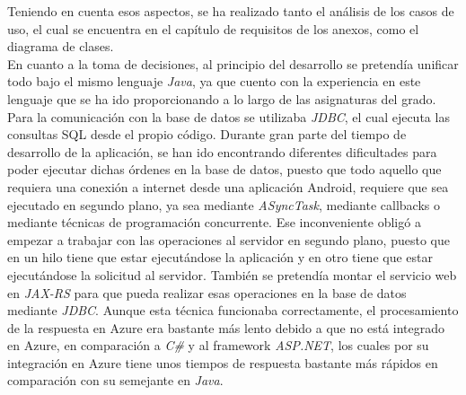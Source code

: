 Teniendo en cuenta esos aspectos, se ha realizado tanto el análisis de los casos
de uso, el cual se encuentra en el capítulo de requisitos de los anexos, como el
diagrama de clases.
\\
En cuanto a la toma de decisiones, al principio del desarrollo se pretendía
unificar todo bajo el mismo lenguaje \textit{Java}, ya que cuento con la
experiencia en este lenguaje que se ha ido proporcionando a lo largo de las
asignaturas del grado. Para la comunicación con la base de datos se utilizaba
\textit{JDBC}, el cual ejecuta las consultas SQL desde el propio código. Durante
gran parte del tiempo de desarrollo de la aplicación, se han ido encontrando
diferentes dificultades para poder ejecutar dichas órdenes en la base de datos,
puesto que todo aquello que requiera una conexión a internet desde una
aplicación Android, requiere que sea ejecutado en segundo plano, ya sea mediante
\textit{ASyncTask}, mediante callbacks o mediante técnicas de programación
concurrente. Ese inconveniente obligó a empezar a trabajar con las operaciones
al servidor en segundo plano, puesto que en un hilo tiene que estar ejecutándose
la aplicación y en otro tiene que estar ejecutándose la solicitud al servidor.
También se pretendía montar el servicio web en \textit{JAX-RS} para que pueda
realizar esas operaciones en la base de datos mediante \textit{JDBC}. Aunque
esta técnica funcionaba correctamente, el procesamiento de la respuesta en Azure
era bastante más lento debido a que no está integrado en Azure, en comparación a
\textit{C\#} y al framework \textit{ASP.NET}, los cuales por su integración en
Azure tiene unos tiempos de respuesta bastante más rápidos en comparación con su
semejante en \textit{Java}.


